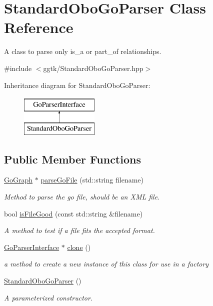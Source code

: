 \hypertarget{classStandardOboGoParser}{}\section{Standard\+Obo\+Go\+Parser Class Reference}
\label{classStandardOboGoParser}


A class to parse only is\+\_\+a or part\+\_\+of relationships.  




{\ttfamily \#include $<$ggtk/\+Standard\+Obo\+Go\+Parser.\+hpp$>$}

Inheritance diagram for Standard\+Obo\+Go\+Parser\+:\begin{figure}[H]
\begin{center}
\leavevmode
\includegraphics[height=2.000000cm]{classStandardOboGoParser}
\end{center}
\end{figure}
\subsection*{Public Member Functions}
\begin{DoxyCompactItemize}
\item 
\hyperlink{classGoGraph}{Go\+Graph} $\ast$ \hyperlink{classStandardOboGoParser_a4eb0d67f0c78456d1e0a9a3f55294424}{parse\+Go\+File} (std\+::string filename)
\begin{DoxyCompactList}\small\item\em Method to parse the go file, should be an X\+ML file. \end{DoxyCompactList}\item 
bool \hyperlink{classStandardOboGoParser_af6c430101cecf73606ae979d4de6ea7f}{is\+File\+Good} (const std\+::string \&filename)
\begin{DoxyCompactList}\small\item\em A method to test if a file fits the accepted format. \end{DoxyCompactList}\item 
\hyperlink{classGoParserInterface}{Go\+Parser\+Interface} $\ast$ \hyperlink{classStandardOboGoParser_aa4c7c326bf20327645fe6df7d57e3fc3}{clone} ()
\begin{DoxyCompactList}\small\item\em a method to create a new instance of this class for use in a factory \end{DoxyCompactList}\item 
\hyperlink{classStandardOboGoParser_ac7d246fea7b1cad797242405c38f8d4a}{Standard\+Obo\+Go\+Parser} ()
\begin{DoxyCompactList}\small\item\em A parameterized constructor. \end{DoxyCompactList}\end{DoxyCompactItemize}


